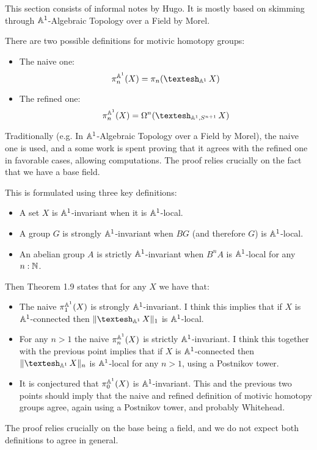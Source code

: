 This section consists of informal notes by Hugo. It is mostly based on skimming through $\mathbb{A}^1$-Algebraic Topology over a Field by Morel.

There are two possible definitions for motivic homotopy groups:
\begin{itemize}
\item The naive one:
\[\pi_n^{\A^1}(X) = \pi_n(\shape_{\A^1}X)\]
\item The refined one:
\[\pi_n^{\A^1}(X) = \Omega^n(\shape_{\A^1,S^{n+1}} X)\]
\end{itemize}

Traditionally (e.g. In $\mathbb{A}^1$-Algebraic Topology over a Field by Morel), the naive one is used, and a some work is spent proving that it agrees with the refined one in favorable cases, allowing computations. The proof relies crucially on the fact that we have a base field.

This is formulated using three key definitions:
\begin{itemize}
\item A set $X$ is $\mathbb{A}^1$-invariant when it is $\mathbb{A}^1$-local.
\item A group $G$ is strongly $\mathbb{A}^1$-invariant when $BG$ (and therefore $G$) is $\mathbb{A}^1$-local.
\item An abelian group $A$ is strictly $\mathbb{A}^1$-invariant when $B^nA$ is $\mathbb{A}^1$-local for any $n:\mathbb{N}$.
\end{itemize}

Then Theorem 1.9 states that for any $X$ we have that: 
\begin{itemize}
\item The naive $\pi_1^{\mathbb{A}^1}(X)$ is strongly $\mathbb{A}^1$-invariant. I think this implies that if $X$ is $\mathbb{A}^1$-connected then $\propTrunc{\shape_{\A^1}X}_1$ is $\mathbb{A}^1$-local.
\item For any $n>1$ the naive $\pi_n^{\mathbb{A}^1}(X)$ is strictly $\mathbb{A}^1$-invariant. I think this together with the previous point implies that if $X$ is $\mathbb{A}^1$-connected then $\propTrunc{\shape_{\A^1}X}_n$ is $\mathbb{A}^1$-local for any $n>1$, using a Postnikov tower.
\item It is conjectured that $\pi^{\mathbb{A}^1}_0(X)$ is $\mathbb{A}^1$-invariant. This and the previous two points should imply that the naive and refined definition of motivic homotopy groups agree, again using a Postnikov tower, and probably Whitehead.
\end{itemize}

The proof relies crucially on the base being a field, and we do not expect both definitions to agree in general.

